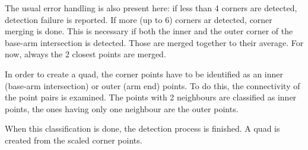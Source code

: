 The usual error handling is also present here: if less than 4 corners are detected, detection failure is reported.
If more (up to 6) corners ar detected, corner merging is done.
This is necessary if both the inner and the outer corner of the base-arm intersection is detected.
Those are merged together to their average.
For now, always the 2 closest points are merged.

In order to create a quad, the corner points have to be identified as an inner (base-arm intersection) or outer (arm end) points.
To do this, the connectivity of the point pairs is examined.
The points with 2 neighbours are classified as inner points, the ones having only one neighbour are the outer points.

When this classification is done, the detection process is finished.
A quad is created from the scaled corner points.
